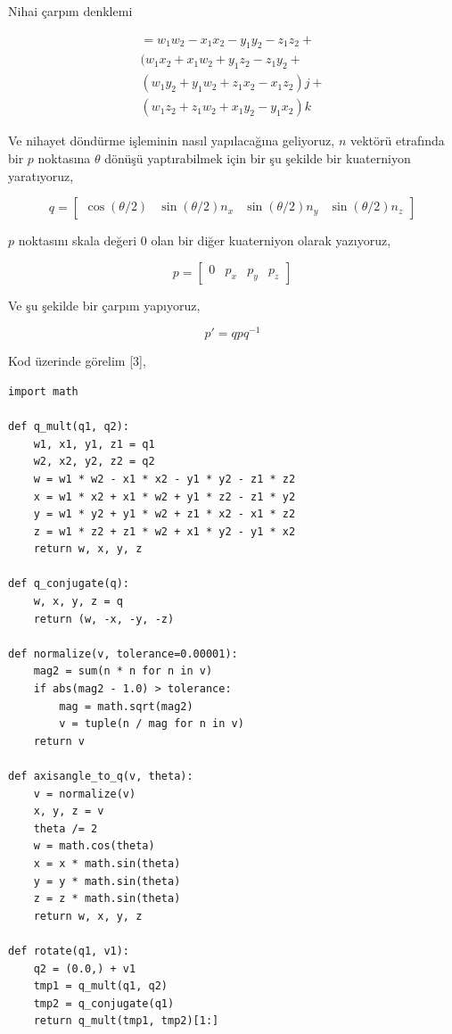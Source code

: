 \documentclass[12pt,fleqn]{article}\usepackage{../../common}
\begin{document}
Nihai çarpım denklemi

\begin{align*}
= w_1 w_2 - x_1 x_2 - y_1 y_2 - z_1 z_2 + \\
(w_1 x_2 + x_1 w_2 + y_1 z_2 - z_1 y_2 + \\
(w_1 y_2 + y_1 w_2 + z_1 x_2 - x_1 z_2) j + \\
(w_1 z_2 + z_1 w_2 + x_1 y_2 - y_1 x_2) k
\end{align*}

Ve nihayet döndürme işleminin nasıl yapılacağına geliyoruz, $n$ vektörü
etrafında bir $p$ noktasına $\theta$ dönüşü yaptırabilmek için bir şu şekilde
bir kuaterniyon yaratıyoruz,

$$
q = [\begin{array}{cccc}
    \cos(\theta/2) &
    \sin(\theta/2) n_x &
    \sin(\theta/2) n_y &
    \sin(\theta/2) n_z \end{array}]
$$

$p$ noktasını skala değeri 0 olan bir diğer kuaterniyon olarak yazıyoruz,

$$
p = [\begin{array}{cccc} 0 & p_x & p_y & p_z \end{array}]
$$

Ve şu şekilde bir çarpım yapıyoruz,

$$
p' = q p q^{-1}
$$

Kod üzerinde görelim [3],

\begin{verbatim}
import math

def q_mult(q1, q2):
    w1, x1, y1, z1 = q1
    w2, x2, y2, z2 = q2
    w = w1 * w2 - x1 * x2 - y1 * y2 - z1 * z2
    x = w1 * x2 + x1 * w2 + y1 * z2 - z1 * y2
    y = w1 * y2 + y1 * w2 + z1 * x2 - x1 * z2
    z = w1 * z2 + z1 * w2 + x1 * y2 - y1 * x2
    return w, x, y, z

def q_conjugate(q):
    w, x, y, z = q
    return (w, -x, -y, -z)

def normalize(v, tolerance=0.00001):
    mag2 = sum(n * n for n in v)
    if abs(mag2 - 1.0) > tolerance:
        mag = math.sqrt(mag2)
        v = tuple(n / mag for n in v)
    return v

def axisangle_to_q(v, theta):
    v = normalize(v)
    x, y, z = v
    theta /= 2
    w = math.cos(theta)
    x = x * math.sin(theta)
    y = y * math.sin(theta)
    z = z * math.sin(theta)
    return w, x, y, z

def rotate(q1, v1):
    q2 = (0.0,) + v1
    tmp1 = q_mult(q1, q2)
    tmp2 = q_conjugate(q1)
    return q_mult(tmp1, tmp2)[1:]
    
\end{verbatim}
\end{document}
